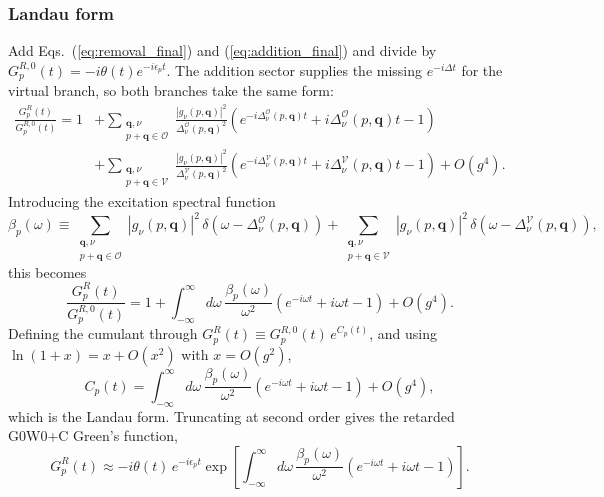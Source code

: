 \subsubsection{Landau form}
Add Eqs.~(\ref{eq:removal_final}) and (\ref{eq:addition_final}) and divide by $G_p^{R,0}(t)=-i\theta(t)e^{-i\epsilon_pt}$. The addition sector supplies the missing $e^{-i\Delta t}$ for the virtual branch, so both branches take the same form:
\begin{align}
\frac{G_p^R(t)}{G_p^{R,0}(t)}
=1&+\sum_{\substack{\bm q,\nu\\ p+\bm q\in\mathcal O}}\frac{|g_\nu(p,\bm q)|^2}{\Delta^{\mathcal O}_\nu(p,\bm q)^2}\left(e^{-i\Delta^{\mathcal O}_\nu(p,\bm q)t}+i\Delta^{\mathcal O}_\nu(p,\bm q)t-1\right)\nonumber\\
&+\sum_{\substack{\bm q,\nu\\ p+\bm q\in\mathcal V}}\frac{|g_\nu(p,\bm q)|^2}{\Delta^{\mathcal V}_\nu(p,\bm q)^2}\left(e^{-i\Delta^{\mathcal V}_\nu(p,\bm q)t}+i\Delta^{\mathcal V}_\nu(p,\bm q)t-1\right)+O(g^4).
\end{align}
Introducing the excitation spectral function
\begin{equation}
\beta_p(\omega)\equiv\sum_{\substack{\bm q,\nu\\ p+\bm q\in\mathcal O}}|g_\nu(p,\bm q)|^2\,\delta\!\left(\omega-\Delta^{\mathcal O}_\nu(p,\bm q)\right)
+\sum_{\substack{\bm q,\nu\\ p+\bm q\in\mathcal V}}|g_\nu(p,\bm q)|^2\,\delta\!\left(\omega-\Delta^{\mathcal V}_\nu(p,\bm q)\right),
\end{equation}
this becomes
\begin{equation}
\frac{G_p^R(t)}{G_p^{R,0}(t)}=1+\int_{-\infty}^{\infty}d\omega\,\frac{\beta_p(\omega)}{\omega^2}\left(e^{-i\omega t}+i\omega t-1\right)+O(g^4).
\end{equation}
Defining the cumulant through $G_p^R(t)\equiv G_p^{R,0}(t)\,e^{C_p(t)}$, and using $\ln(1+x)=x+O(x^2)$ with $x=O(g^2)$,
\begin{equation}
C_p(t)=\int_{-\infty}^{\infty}d\omega\,\frac{\beta_p(\omega)}{\omega^2}\left(e^{-i\omega t}+i\omega t-1\right)+O(g^4),
\end{equation}
which is the Landau form. Truncating at second order gives the retarded G0W0+C Green's function,
\begin{equation}
G_p^R(t)\approx-i\theta(t)\,e^{-i\epsilon_pt}\exp\!\left[\int_{-\infty}^{\infty}d\omega\,\frac{\beta_p(\omega)}{\omega^2}\left(e^{-i\omega t}+i\omega t-1\right)\right].
\end{equation}

